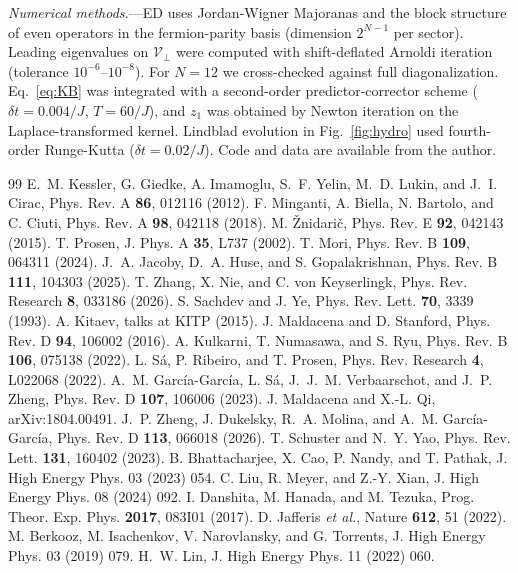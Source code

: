 \documentclass[aps,prl,twocolumn,superscriptaddress,amsmath,amssymb,10pt]{revtex4-2}
\begin{document}
\emph{Numerical methods.}---ED uses Jordan-Wigner Majoranas and the block structure of even operators in the fermion-parity basis (dimension $2^{N-1}$ per sector). Leading eigenvalues on $\mathcal V_\perp$ were computed with shift-deflated Arnoldi iteration (tolerance $10^{-6}$--$10^{-8}$). For $N=12$ we cross-checked against full diagonalization. Eq.~\eqref{eq:KB} was integrated with a second-order predictor-corrector scheme ($\delta t=0.004/J$, $T=60/J$), and $z_1$ was obtained by Newton iteration on the Laplace-transformed kernel. Lindblad evolution in Fig.~\ref{fig:hydro} used fourth-order Runge-Kutta ($\delta t=0.02/J$). Code and data are available from the author.

\begin{thebibliography}{99}
 E.~M. Kessler, G. Giedke, A. Imamoglu, S.~F. Yelin, M.~D. Lukin, and J.~I. Cirac, Phys. Rev. A \textbf{86}, 012116 (2012).
 F. Minganti, A. Biella, N. Bartolo, and C. Ciuti, Phys. Rev. A \textbf{98}, 042118 (2018).
 M. \v{Z}nidari\v{c}, Phys. Rev. E \textbf{92}, 042143 (2015).
 T. Prosen, J. Phys. A \textbf{35}, L737 (2002).
 T. Mori, Phys. Rev. B \textbf{109}, 064311 (2024).
 J.~A. Jacoby, D.~A. Huse, and S. Gopalakrishnan, Phys. Rev. B \textbf{111}, 104303 (2025).
 T. Zhang, X. Nie, and C. von Keyserlingk, Phys. Rev. Research \textbf{8}, 033186 (2026).
 S. Sachdev and J. Ye, Phys. Rev. Lett. \textbf{70}, 3339 (1993).
 A. Kitaev, talks at KITP (2015).
 J. Maldacena and D. Stanford, Phys. Rev. D \textbf{94}, 106002 (2016).
 A. Kulkarni, T. Numasawa, and S. Ryu, Phys. Rev. B \textbf{106}, 075138 (2022).
 L. S\'a, P. Ribeiro, and T. Prosen, Phys. Rev. Research \textbf{4}, L022068 (2022).
 A.~M. Garc\'ia-Garc\'ia, L. S\'a, J.~J.~M. Verbaarschot, and J.~P. Zheng, Phys. Rev. D \textbf{107}, 106006 (2023).
 J. Maldacena and X.-L. Qi, arXiv:1804.00491.
 J.~P. Zheng, J. Dukelsky, R.~A. Molina, and A.~M. Garc\'ia-Garc\'ia, Phys. Rev. D \textbf{113}, 066018 (2026).
 T. Schuster and N.~Y. Yao, Phys. Rev. Lett. \textbf{131}, 160402 (2023).
 B. Bhattacharjee, X. Cao, P. Nandy, and T. Pathak, J. High Energy Phys. 03 (2023) 054.
 C. Liu, R. Meyer, and Z.-Y. Xian, J. High Energy Phys. 08 (2024) 092.
 I. Danshita, M. Hanada, and M. Tezuka, Prog. Theor. Exp. Phys. \textbf{2017}, 083I01 (2017).
 D. Jafferis \emph{et al.}, Nature \textbf{612}, 51 (2022).
 M. Berkooz, M. Isachenkov, V. Narovlansky, and G. Torrents, J. High Energy Phys. 03 (2019) 079.
 H.~W. Lin, J. High Energy Phys. 11 (2022) 060.
\end{thebibliography}
\end{document}

